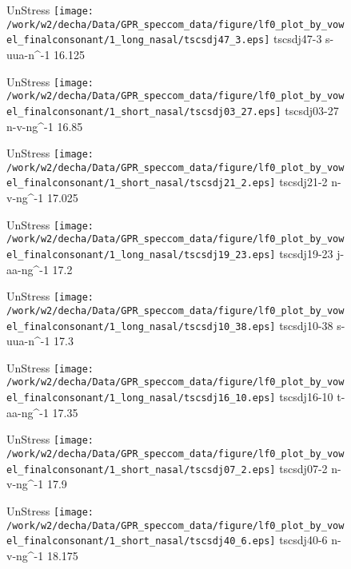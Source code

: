 \documentclass{article}
\begin{document}
\begin{figure}[t]
\begin{minipage}[b]{.24\textwidth}
UnStress
\centering
\texttt{[image: /work/w2/decha/Data/GPR\_speccom\_data/figure/lf0\_plot\_by\_vowel\_finalconsonant/1\_long\_nasal/tscsdj47\_3.eps]}
tscsdj47-3 s-uua-n\textasciicircum-1 16.125
\end{minipage}
\begin{minipage}[b]{.24\textwidth}
UnStress
\centering
\texttt{[image: /work/w2/decha/Data/GPR\_speccom\_data/figure/lf0\_plot\_by\_vowel\_finalconsonant/1\_short\_nasal/tscsdj03\_27.eps]}
tscsdj03-27 n-v-ng\textasciicircum-1 16.85
\end{minipage}
\begin{minipage}[b]{.24\textwidth}
UnStress
\centering
\texttt{[image: /work/w2/decha/Data/GPR\_speccom\_data/figure/lf0\_plot\_by\_vowel\_finalconsonant/1\_short\_nasal/tscsdj21\_2.eps]}
tscsdj21-2 n-v-ng\textasciicircum-1 17.025
\end{minipage}
\begin{minipage}[b]{.24\textwidth}
UnStress
\centering
\texttt{[image: /work/w2/decha/Data/GPR\_speccom\_data/figure/lf0\_plot\_by\_vowel\_finalconsonant/1\_long\_nasal/tscsdj19\_23.eps]}
tscsdj19-23 j-aa-ng\textasciicircum-1 17.2
\end{minipage}
\end{figure}

\begin{figure}[t]
\begin{minipage}[b]{.24\textwidth}
UnStress
\centering
\texttt{[image: /work/w2/decha/Data/GPR\_speccom\_data/figure/lf0\_plot\_by\_vowel\_finalconsonant/1\_long\_nasal/tscsdj10\_38.eps]}
tscsdj10-38 s-uua-n\textasciicircum-1 17.3
\end{minipage}
\begin{minipage}[b]{.24\textwidth}
UnStress
\centering
\texttt{[image: /work/w2/decha/Data/GPR\_speccom\_data/figure/lf0\_plot\_by\_vowel\_finalconsonant/1\_long\_nasal/tscsdj16\_10.eps]}
tscsdj16-10 t-aa-ng\textasciicircum-1 17.35
\end{minipage}
\begin{minipage}[b]{.24\textwidth}
UnStress
\centering
\texttt{[image: /work/w2/decha/Data/GPR\_speccom\_data/figure/lf0\_plot\_by\_vowel\_finalconsonant/1\_short\_nasal/tscsdj07\_2.eps]}
tscsdj07-2 n-v-ng\textasciicircum-1 17.9
\end{minipage}
\begin{minipage}[b]{.24\textwidth}
UnStress
\centering
\texttt{[image: /work/w2/decha/Data/GPR\_speccom\_data/figure/lf0\_plot\_by\_vowel\_finalconsonant/1\_short\_nasal/tscsdj40\_6.eps]}
tscsdj40-6 n-v-ng\textasciicircum-1 18.175
\end{minipage}
\end{figure}
\end{document}

